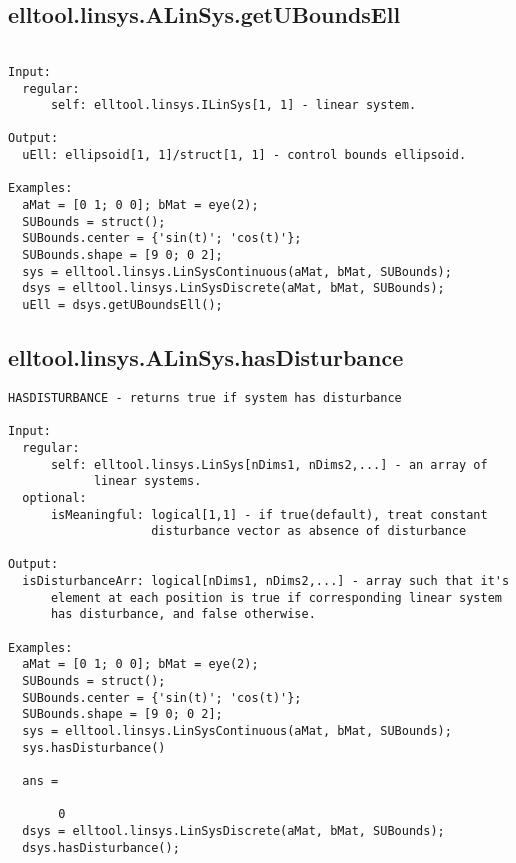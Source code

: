 \subsection{\texorpdfstring{elltool.linsys.ALinSys.getUBoundsEll}{getUBoundsEll}}\label{method:elltool.linsys.ALinSys.getUBoundsEll}
\begin{verbatim}

Input:
  regular:
      self: elltool.linsys.ILinSys[1, 1] - linear system.

Output:
  uEll: ellipsoid[1, 1]/struct[1, 1] - control bounds ellipsoid.

Examples:
  aMat = [0 1; 0 0]; bMat = eye(2);
  SUBounds = struct();
  SUBounds.center = {'sin(t)'; 'cos(t)'};
  SUBounds.shape = [9 0; 0 2];
  sys = elltool.linsys.LinSysContinuous(aMat, bMat, SUBounds);
  dsys = elltool.linsys.LinSysDiscrete(aMat, bMat, SUBounds);
  uEll = dsys.getUBoundsEll();
\end{verbatim}
\subsection{\texorpdfstring{elltool.linsys.ALinSys.hasDisturbance}{hasDisturbance}}\label{method:elltool.linsys.ALinSys.hasDisturbance}
\begin{verbatim}
HASDISTURBANCE - returns true if system has disturbance

Input:
  regular:
      self: elltool.linsys.LinSys[nDims1, nDims2,...] - an array of
            linear systems.
  optional:
      isMeaningful: logical[1,1] - if true(default), treat constant
                    disturbance vector as absence of disturbance

Output:
  isDisturbanceArr: logical[nDims1, nDims2,...] - array such that it's
      element at each position is true if corresponding linear system
      has disturbance, and false otherwise.

Examples:
  aMat = [0 1; 0 0]; bMat = eye(2);
  SUBounds = struct();
  SUBounds.center = {'sin(t)'; 'cos(t)'};
  SUBounds.shape = [9 0; 0 2];
  sys = elltool.linsys.LinSysContinuous(aMat, bMat, SUBounds);
  sys.hasDisturbance()

  ans =

       0
  dsys = elltool.linsys.LinSysDiscrete(aMat, bMat, SUBounds);
  dsys.hasDisturbance();
\end{verbatim}
